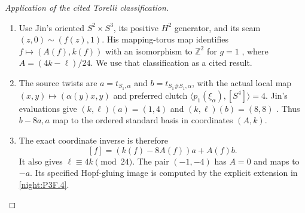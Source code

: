 \begin{proof}[Application of the cited Torelli classification]
\begin{enumerate}[label=\arabic*.]
\item Use Jin's oriented $S^2\times S^3$, its positive $H^2$ generator,
and its seam $(z,0)\sim(f(z),1)$. His mapping-torus map identifies
$f\mapsto(A(f),k(f))$ with an isomorphism to $\mathbb Z^2$ for
$g=1$ \cite[Proposition~3.1, pp.~10--11; Theorem~4.9, p.~24]{Jin2026},
where $A=(4k-\ell)/24$. We use that classification as a cited result.
\item The source twists are
$a=t_{S_1,\alpha}$ and $b=t_{S_1\#S_1,\alpha}$, with the actual
local map $(x,y)\mapsto(\alpha(y)x,y)$ and preferred clutch
$\langle p_1(\xi_\alpha),[S^4]\rangle=4$.
Jin's evaluations give
$(k,\ell)(a)=(1,4)$ and $(k,\ell)(b)=(8,8)$
\cite[Lemma~4.4, pp.~16--17; Lemma~4.8 and the $g=1$ table, p.~23]{Jin2026}.
Thus $b-8a,a$ map to the ordered standard basis in coordinates $(A,k)$.
\item The exact coordinate inverse is therefore
\[
 [f]=(k(f)-8A(f))a+A(f)b. \tag{P3F.3.1}
\]
It also gives $\ell\equiv4k\pmod{24}$. The pair $(-1,-4)$
has $A=0$ and maps to $-a$. Its specified Hopf-gluing image is
computed by the explicit extension in \cref{night:P3F.4}.
\end{enumerate}
\end{proof}
